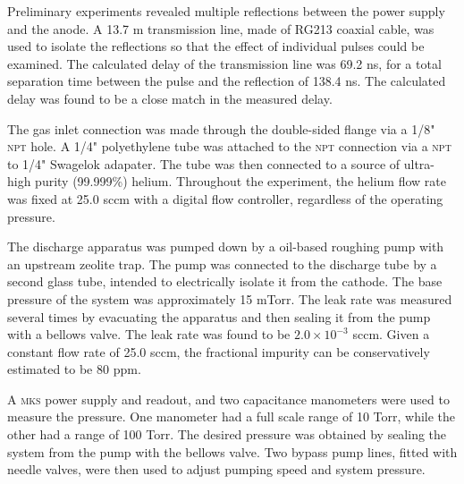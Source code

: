 Preliminary experiments revealed multiple reflections between the power supply
and the anode. A 13.7 m transmission line, made of RG213 coaxial cable, was used
to isolate the reflections so that the effect of individual pulses could be
examined. The calculated delay of the transmission line was 69.2 ns, for a total
separation time between the pulse and the reflection of 138.4 ns. The calculated
delay was found to be a close match in the measured delay.

The gas inlet connection was made through the double-sided flange via a 1/8"
\textsc{npt} hole. A 1/4" polyethylene tube was attached to the \textsc{npt}
connection via a \textsc{npt} to 1/4" Swagelok adapater. The tube was then
connected to a source of ultra-high purity (99.999\%) helium. Throughout the
experiment, the helium flow rate was fixed at 25.0 sccm with a digital flow
controller, regardless of the operating pressure.

The discharge apparatus was pumped down by a oil-based roughing pump with an
upstream zeolite trap. The pump was connected to the discharge tube by a second
glass tube, intended to electrically isolate it from the cathode. The base
pressure of the system was approximately 15 mTorr. The leak rate was measured
several times by evacuating the apparatus and then sealing it from the pump with
a bellows valve. The leak rate was found to be $2.0\times 10^{-3}$ sccm. Given a
constant flow rate of 25.0 sccm, the fractional impurity can be conservatively
estimated to be 80 ppm.

A \textsc{mks}  power supply and readout, and two capacitance
manometers were used to measure the pressure. One manometer had a full scale
range of 10 Torr, while the other had a range of 100 Torr. The desired pressure
was obtained by sealing the system from the pump with the bellows valve. Two
bypass pump lines, fitted with needle valves, were then used to adjust pumping
speed and system pressure.

